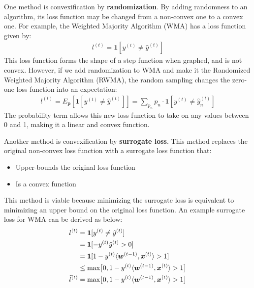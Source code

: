 \documentclass[11pt]{article}
\begin{document}
One method is convexification by \textbf{randomization}. By adding randomness to an algorithm, its loss function may be changed from a non-convex one to a convex one. For example, the Weighted Majority Algorithm (WMA) has a loss function given by:
\begin{align}
    l^{(t)} = \mathbf{1}[y^{(t)} \neq \hat{y}^{(t)}]
\end{align}
This loss function forms the shape of a step function when graphed, and is not convex. However, if we add randomization to WMA and make it the Randomized Weighted Majority Algorithm (RWMA), the random sampling changes the zero-one loss function into an expectation:
\begin{align}
    l^{(t)} = E_{\boldsymbol{p}}[\mathbf{1}[y^{(t)} \neq \hat{y}^{(t)}]]=\sum_{p_n} p_n \cdot \mathbf{1}[y^{(t)} \neq \hat{y}_n^{(t)}]
\end{align}
The probability term allows this new loss function to take on any values between 0 and 1, making it a linear and convex function.

Another method is convexification by \textbf{surrogate loss}. This method replaces the original non-convex loss function with a surrogate loss function that:
\begin{itemize}
    \item Upper-bounds the original loss function
    \item Is a convex function
\end{itemize}
This method is viable because minimizing the surrogate loss is equivalent to minimizing an upper bound on the original loss function. An example surrogate loss for WMA can be derived as below:
\begin{align}
    l^{(t)} &= \mathbf{1}[y^{(t)} \neq \hat{y}^{(t)}]\\
     &= \mathbf{1}[-y^{(t)}\hat{y}^{(t)}>0]\\
     &= \mathbf{1}[1-y^{(t)}\langle \boldsymbol{w}^{(t-1)},\boldsymbol{x}^{(t)}\rangle >1]\\
     &\leq     \text{max}\big[0,1-y^{(t)}\langle \boldsymbol{w}^{(t-1)},\boldsymbol{x}^{(t)}\rangle>1\big]\\
     \Tilde{l}^{(t)}&=\text{max}\big[0,1-y^{(t)}\langle \boldsymbol{w}^{(t-1)},\boldsymbol{x}^{(t)}\rangle>1\big]
\end{align}
\end{document}
